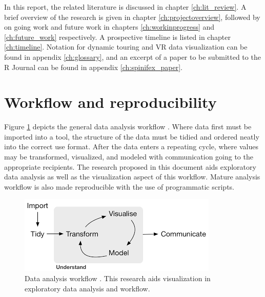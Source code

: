 \documentclass{monashthesis}
\begin{document}
In this report, the related literature is discussed in chapter
\ref{ch:lit_review}. A brief overview of the research is given in
chapter \ref{ch:projectoverview}, followed by on going work and future
work in chapters \ref{ch:workinprogress} and \ref{ch:future_work}
respectively. A prospective timeline is listed in chapter
\ref{ch:timeline}. Notation for dynamic touring and VR data
visualization can be found in appendix \ref{ch:glossary}, and an excerpt
of a paper to be submitted to the R Journal can be found in appendix
\ref{ch:spinifex_paper}.

\section{Workflow and
reproducibility}\label{workflow-and-reproducibility}

Figure \ref{fig:dataanalysisworkflow} depicts the general data analysis
workflow \autocite{wickham_r_2016}. Where data first must be imported
into a tool, the structure of the data must be tidied and ordered neatly
into the correct use format. After the data enters a repeating cycle,
where values may be transformed, visualized, and modeled with
communication going to the appropriate recipients. The research proposed
in this document aids exploratory data analysis as well as the
visualization aspect of this workflow. Mature analysis workflow is also
made reproducible with the use of programmatic scripts.





\begin{figure}

{\centering \includegraphics[width=1\linewidth]{./figures/data_analysis_workflow} 

}

\caption{Data analysis workflow
\autocite{wickham_r_2016}. This research aids visualization in
exploratory data analysis and workflow.}\label{fig:dataanalysisworkflow}
\end{figure}
\end{document}
